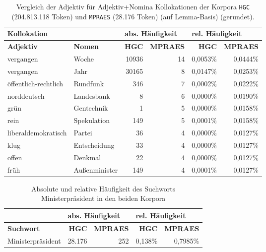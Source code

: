 \documentclass[%
	type=document,%
  	style=article,%
  	media=print,
  	pages=oneside,%
  	prefixLecturer=Dozenten:,
  	author=multiple,
]{unihildesheim} %
\begin{document}
\begin{table}[!hpb]
\begin{tabularx}{\textwidth}{llrrrr}
		\toprule
		\multicolumn{2}{l}{Kollokation} & \multicolumn{2}{l}{abs. Häufigkeit}
		& \multicolumn{2}{l}{rel. Häufigkeit} \\
		\midrule
		\textbf{Adjektiv} & \textbf{Nomen} & \textbf{HGC} & \textbf{MPRAES}
		&	\textbf{HGC} & \textbf{MPRAES} \\
		\midrule
		vergangen & Woche & 10936 & 14 & 0,0053\% & 0,0444\%\\
		vergangen & Jahr & 30165 & 8 & 0,0147\% & 0,0253\%\\
		öffentlich-rechtlich & Rundfunk & 346 & 7 & 0,0002\% & 0,0222\%\\
		norddeutsch & Landesbank & 8 & 6 & 0,0000\% & 0,0190\%\\
		grün & Gentechnik & 1 & 5 & 0,0000\% & 0,0158\%\\
		rein & Spekulation & 149 & 5 & 0,0001\% & 0,0158\%\\
		liberaldemokratisch & Partei & 36 & 4 & 0,0000\% & 0,0127\%\\
		klug & Entscheidung & 33 & 4 & 0,0000\% & 0,0127\%\\
		offen & Denkmal & 22 & 4 & 0,0000\% & 0,0127\%\\
		früh & Außenminister & 149 & 4 & 0,0001\% & 0,0127\%\\
		\bottomrule
	\end{tabularx}
	\caption{Vergleich der Adjektiv für Adjektiv+Nomina Kollokationen der
	Korpora \texttt{HGC} (204.813.118 Token) und \texttt{MPRAES} (28.176 Token)
	(auf Lemma-Basis) (gerundet).}
	\label{tab:compare_adj_n}
\end{table}

\begin{table}[htpb]\label{t}
	\center
	\begin{tabularx}{0.8\textwidth}{lrrrr}
		\toprule
		& \multicolumn{2}{l}{\textbf{abs. Häufigkeit}} &
		\multicolumn{2}{l}{\textbf{rel. Häufigkeit}} \\
		\midrule
		\textbf{Suchwort} & \textbf{HGC} & \textbf{MPRAES} & \textbf{HGC}
		&	\textbf{MPRAES} \\		
		Ministerpräsident & 28.176 & 252 & 0,138\% & 0,7985\% \\
		\bottomrule
	\end{tabularx}
	\caption{Absolute und relative Häufigkeit des Suchworts Ministerpräsident in
	den beiden Korpora}
	\label{tab:undefined}
\end{table}
\end{document}
